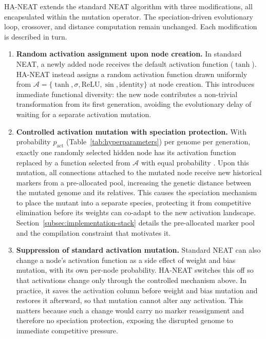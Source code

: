 HA-NEAT extends the standard NEAT algorithm with three modifications, all encapsulated within the mutation operator.
The speciation-driven evolutionary loop, crossover, and distance computation remain unchanged.
Each modification is described in turn.

\begin{enumerate}
    \item \textbf{Random activation assignment upon node creation.} In standard NEAT, a newly added node receives the default activation function ($\tanh$). HA-NEAT instead assigns a random activation function drawn uniformly from $\mathcal{A} = \{\tanh, \sigma, \text{ReLU}, \sin, \text{identity}\}$ at node creation. This introduces immediate functional diversity: the new node contributes a non-trivial transformation from its first generation, avoiding the evolutionary delay of waiting for a separate activation mutation.
    
    \item \textbf{Controlled activation mutation with speciation protection.} With probability $p_{\text{act}}$ (Table~\ref{tab:hyperparameters}) per genome per generation, exactly one randomly selected hidden node has its activation function replaced by a function selected from
    $\mathcal{A}$ with equal probability . Upon this mutation, all connections attached to the mutated node receive new historical markers from a pre-allocated pool, increasing the genetic distance between the mutated genome and its relatives. This causes the speciation mechanism to place the mutant into a separate species, protecting it from competitive elimination before its weights can co-adapt to the new activation landscape. Section~\ref{subsec:implementation-stack} details the pre-allocated marker pool and the compilation constraint that motivates it.
    
    \item \textbf{Suppression of standard activation mutation.} Standard NEAT can also change a node's activation function as a side effect of weight and bias mutation, with its own per-node probability. HA-NEAT switches this off so that activations change only through the controlled mechanism above. In practice, it saves the activation column before weight and bias mutation and restores it afterward, so that mutation cannot alter any activation. This matters because such a change would carry no marker reassignment and therefore no speciation protection, exposing the disrupted genome to immediate competitive pressure.
\end{enumerate}


